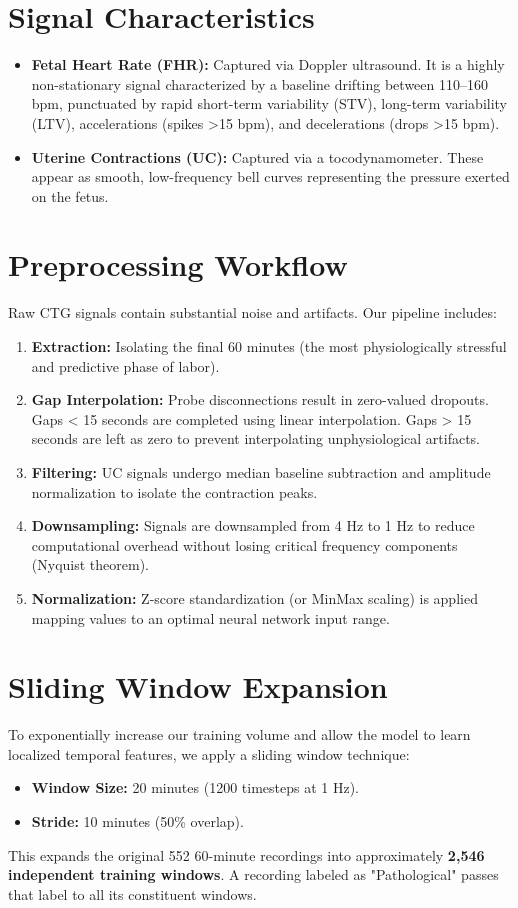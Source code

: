 \documentclass[12pt,a4paper]{report}
\begin{document}
\section{Signal Characteristics}
\begin{itemize}
    \item \textbf{Fetal Heart Rate (FHR):} Captured via Doppler ultrasound. It is a highly non-stationary signal characterized by a baseline drifting between 110--160 bpm, punctuated by rapid short-term variability (STV), long-term variability (LTV), accelerations (spikes >15 bpm), and decelerations (drops >15 bpm).
    \item \textbf{Uterine Contractions (UC):} Captured via a tocodynamometer. These appear as smooth, low-frequency bell curves representing the pressure exerted on the fetus.
\end{itemize}

\section{Preprocessing Workflow}
Raw CTG signals contain substantial noise and artifacts. Our pipeline includes:
\begin{enumerate}
    \item \textbf{Extraction:} Isolating the final 60 minutes (the most physiologically stressful and predictive phase of labor).
    \item \textbf{Gap Interpolation:} Probe disconnections result in zero-valued dropouts. Gaps < 15 seconds are completed using linear interpolation. Gaps > 15 seconds are left as zero to prevent interpolating unphysiological artifacts.
    \item \textbf{Filtering:} UC signals undergo median baseline subtraction and amplitude normalization to isolate the contraction peaks.
    \item \textbf{Downsampling:} Signals are downsampled from 4 Hz to 1 Hz to reduce computational overhead without losing critical frequency components (Nyquist theorem).
    \item \textbf{Normalization:} Z-score standardization (or MinMax scaling) is applied mapping values to an optimal neural network input range.
\end{enumerate}

\section{Sliding Window Expansion}
To exponentially increase our training volume and allow the model to learn localized temporal features, we apply a sliding window technique:
\begin{itemize}
    \item \textbf{Window Size:} 20 minutes (1200 timesteps at 1 Hz).
    \item \textbf{Stride:} 10 minutes (50\% overlap).
\end{itemize}
This expands the original 552 60-minute recordings into approximately \textbf{2,546 independent training windows}. A recording labeled as "Pathological" passes that label to all its constituent windows.
\end{document}
